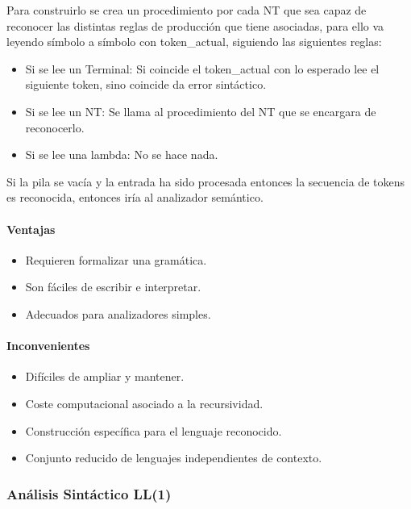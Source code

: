 \documentclass[12pt]{report} %
\begin{document}
Para construirlo se crea un procedimiento por cada NT que sea capaz de
reconocer las distintas reglas de producción que tiene asociadas, para
ello va leyendo símbolo a símbolo con token\_actual, siguiendo las
siguientes reglas:

\begin{itemize}

\item
  Si se lee un Terminal: Si coincide el token\_actual con lo esperado
  lee el siguiente token, sino coincide da error sintáctico.
\item
  Si se lee un NT: Se llama al procedimiento del NT que se encargara de
  reconocerlo.
\item
  Si se lee una lambda: No se hace nada.
\end{itemize}

Si la pila se vacía y la entrada ha sido procesada entonces la secuencia
de tokens es reconocida, entonces iría al analizador semántico.


\paragraph{Ventajas}

\begin{itemize}

\item
  Requieren formalizar una gramática.
\item
  Son fáciles de escribir e interpretar.
\item
  Adecuados para analizadores simples.
\end{itemize}


\paragraph{Inconvenientes}

\begin{itemize}

\item
  Difíciles de ampliar y mantener.
\item
  Coste computacional asociado a la recursividad.
\item
  Construcción específica para el lenguaje reconocido.
\item
  Conjunto reducido de lenguajes independientes de contexto.
\end{itemize}


\subsubsection{Análisis Sintáctico LL(1)}
\end{document}
